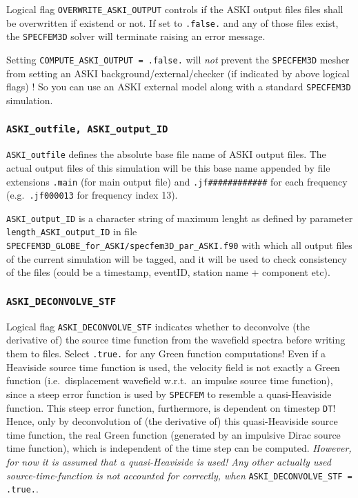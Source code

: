 \documentclass[12pt,a4paper]{article}
\newcommand{\lcode}[1]{\nolinkurl{#1}}
\newcommand{\ASKI}{ {\ttfamily ASKI} }
\begin{document}
Logical flag \lcode{OVERWRITE_ASKI_OUTPUT} controls if the \ASKI{} output files files shall be overwritten if 
existend or not. If set to \lcode{.false.} and any of those files exist, the \lcode{SPECFEM3D} solver will 
terminate raising an error message.

Setting \lcode{COMPUTE_ASKI_OUTPUT = .false.} will \emph{not} prevent the \lcode{SPECFEM3D} mesher from
setting an \ASKI{} background/external/checker (if indicated by above logical flags) ! So you can
use an \ASKI{} external model along with a standard \lcode{SPECFEM3D} simulation.

\subsubsection*{\lcode{ASKI_outfile, ASKI_output_ID}}
\lcode{ASKI_outfile} defines the absolute base file name of \ASKI{} output files.
The actual output files of this simulation will be this base name appended by file extensions
\lcode{.main} (for main output file) and \lcode{.jf############} for each frequency (e.g.\ \lcode{.jf000013} for 
frequency index 13).

\lcode{ASKI_output_ID} is a character
string of maximum lenght as defined by parameter \lcode{length_ASKI_output_ID} in file\\
\lcode{SPECFEM3D_GLOBE_for_ASKI/specfem3D_par_ASKI.f90} 
with which all output files of the current simulation will be tagged, and it will be used to check consistency 
of the files (could be a timestamp, eventID, station name + component etc).

\subsubsection*{\lcode{ASKI_DECONVOLVE_STF}}
Logical flag \lcode{ASKI_DECONVOLVE_STF} indicates whether to deconvolve (the derivative of) the source time 
function from the wavefield spectra before writing them to files. Select \lcode{.true.} for any Green function computations!
Even if a Heaviside source time function is used, the velocity field is not exactly a Green function (i.e.\ displacement 
wavefield w.r.t.\ an impulse source time function), since a steep error function is used by \lcode{SPECFEM} to resemble 
a quasi-Heaviside function. This steep error function, furthermore, is dependent on timestep \lcode{DT}! 
Hence, only by deconvolution of (the derivative of) this quasi-Heaviside source time function, the real Green function 
(generated by an impulsive Dirac source time function), which is independent of the time step can be computed.
\emph{However, for now it is assumed that a quasi-Heaviside is used! Any other actually used source-time-function 
is not accounted for correctly, when} \lcode{ASKI_DECONVOLVE_STF = .true.}.
\end{document}
